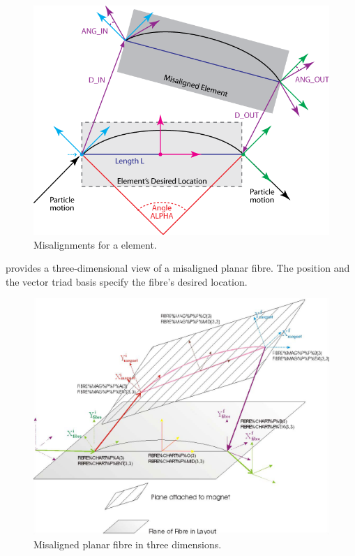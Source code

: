 \begin{figure}[ht]\forceversofloat
  \centering
  \includegraphics{illustrations/misalignment-for-element}
  \caption{Misalignments for a element.}
  \label{fig:Misalignments-for-element}
\end{figure}

 provides a three-dimensional view
of a misaligned planar fibre. The position 
and the vector triad basis  specify the
fibre's desired location.

\begin{figure}[ht]
  \centering
  \includegraphics[width=\textwidth]{illustrations/misaligned-planar-fibre}
  \caption{Misaligned planar fibre in three dimensions.}
  \label{fig:Misaligned-planar-fibre}
\end{figure}


